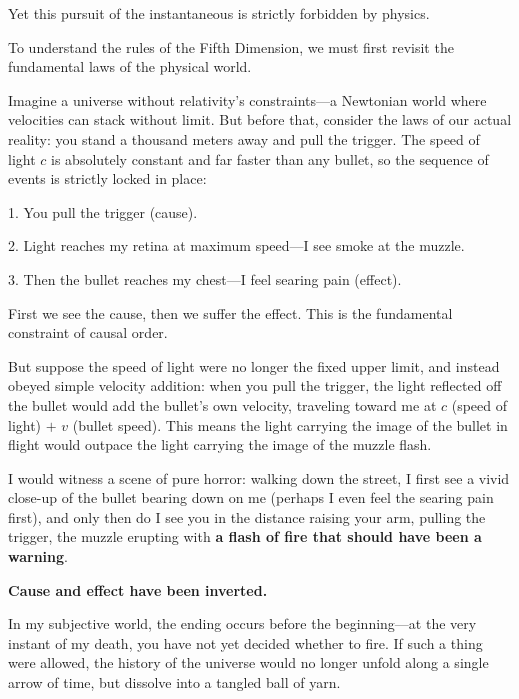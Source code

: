 Yet this pursuit of the instantaneous is strictly forbidden by physics.

To understand the rules of the Fifth Dimension, we must first revisit the fundamental laws of the physical world.

\vspace{1em}

Imagine a universe without relativity's constraints---a Newtonian world where velocities can stack without limit. But before that, consider the laws of our actual reality: you stand a thousand meters away and pull the trigger. The speed of light $c$ is absolutely constant and far faster than any bullet, so the sequence of events is strictly locked in place:

1. You pull the trigger (cause).

2. Light reaches my retina at maximum speed---I see smoke at the muzzle.

3. Then the bullet reaches my chest---I feel searing pain (effect).


\begin{importantbox}
First we see the cause, then we suffer the effect. This is the fundamental constraint of causal order.
\end{importantbox}

But suppose the speed of light were no longer the fixed upper limit, and instead obeyed simple velocity addition: when you pull the trigger, the light reflected off the bullet would add the bullet's own velocity, traveling toward me at $c$ (speed of light) $+$ $v$ (bullet speed). This means the light carrying the image of the bullet in flight would outpace the light carrying the image of the muzzle flash.

\vspace{1em}

I would witness a scene of pure horror: walking down the street, I first see a vivid close-up of the bullet bearing down on me (perhaps I even feel the searing pain first), and only then do I see you in the distance raising your arm, pulling the trigger, the muzzle erupting with \textbf{a flash of fire that should have been a warning}.

\vspace{1em}

\textbf{Cause and effect have been inverted.}

In my subjective world, the ending occurs before the beginning---at the very instant of my death, you have not yet decided whether to fire. If such a thing were allowed, the history of the universe would no longer unfold along a single arrow of time, but dissolve into a tangled ball of yarn.

